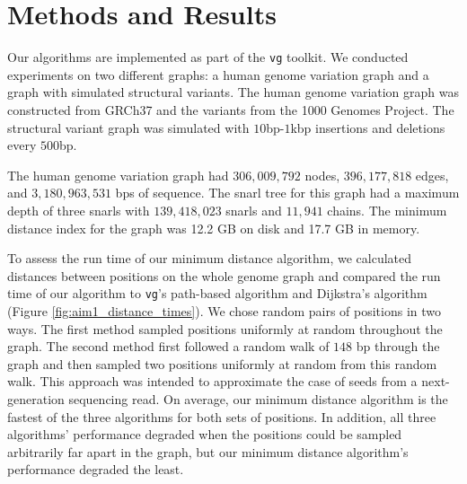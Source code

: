 \documentclass[11pt]{ucscthesis}
\begin{document}
\section{Methods and Results}

Our algorithms are implemented as part of the \texttt{vg} toolkit.
We conducted experiments on two different graphs: a human genome variation graph and a graph with simulated structural variants.
The human genome variation graph was constructed from GRCh37 and the variants from the 1000 Genomes Project.
The structural variant graph was simulated with $10$bp-$1$kbp insertions and deletions every $500$bp.

The human genome variation graph had $306,009,792$ nodes, $396,177,818$ edges, and $3,180,963,531$ bps of sequence.
The snarl tree for this graph had a maximum depth of three snarls with $139,418,023$ snarls and $11,941$ chains.
The minimum distance index for the graph was 12.2 GB on disk and 17.7 GB in memory.

To assess the run time of our minimum distance algorithm, we calculated distances between positions on the whole genome graph and compared the run time of our algorithm to \texttt{vg}'s path-based algorithm and Dijkstra's algorithm (Figure \ref{fig:aim1_distance_times}).
We chose random pairs of positions in two ways. The first method sampled positions uniformly at random throughout the graph.
The second method first followed a random walk of $148$ bp through the graph and then sampled two positions uniformly at random from this random walk.
This approach was intended to approximate the case of seeds from a next-generation sequencing read.
On average, our minimum distance algorithm is the fastest of the three algorithms for both sets of positions.
In addition, all three algorithms' performance degraded when the positions could be sampled arbitrarily far apart in the graph, but our minimum distance algorithm's performance degraded the least.
\end{document}
